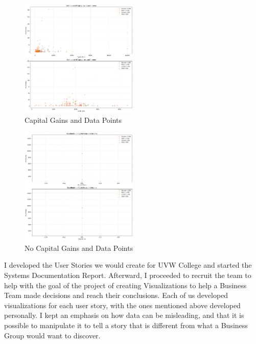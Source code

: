 \documentclass{IEEEtran}
\begin{document}
\begin{figure}[!t]
  \centering
  \captionsetup{justification=centering}
  \includegraphics[width=0.5\textwidth]{CapitalGainsAndIncome.png}%
  \caption{Capital Gains and Data Points}%
  \label{fig:CapitalGainsAndIncome}%
\end{figure}

\begin{figure}[!t]
  \centering
  \captionsetup{justification=centering}
  \includegraphics[width=0.5\textwidth]{ArePeopleWithNoCapitalGainsInOver50KGroup.png}%
  \caption{No Capital Gains and Data Points}%
  \label{fig:ArePeopleWithNoCapitalGainsInOver50KGroup}%
\end{figure}

I developed the User Stories we would create for UVW College and started the Systems Documentation Report. Afterward, I proceeded to recruit the team to help with the goal of the project of creating Visualizations to help a Business Team made decisions and reach their conclusions. Each of us developed visualizations for each user story, with the ones mentioned above developed personally. I kept an emphasis on how data can be misleading, and that it is possible to manipulate it to tell a story that is different from what a Business Group would want to discover. 
\end{document}
